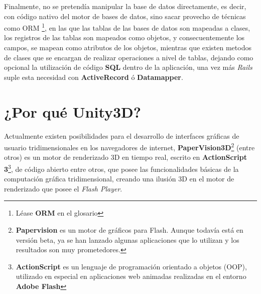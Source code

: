 Finalmente, no se pretendía manipular la base de datos directamente, es decir, con código nativo del motor de bases de datos, sino sacar provecho de técnicas como ORM \footnote{Léase \textbf{ORM} en el glosario}, en las que las tablas de las bases de datos son mapeadas a clases, los registros de las tablas son mapeados como objetos, y consecuentemente los campos, se mapean como atributos de los objetos, mientras que existen metodos de clases que se encargan de realizar operaciones a nivel de tablas, dejando como opcional la utilización de código \textbf{SQL} dentro de la aplicación, una vez más \emph{Rails} suple esta necesidad con \textbf{ActiveRecord} ó \textbf{Datamapper}.

\section{¿Por qué Unity3D?}
 
Actualmente existen posibilidades para el desarrollo de interfaces gráficas de usuario tridimensionales en los navegadores de internet, \textbf{PaperVision3D}\footnote{\textbf{Papervision} es un motor de gráficos para Flash. Aunque todavía está en versión beta, ya se han lanzado algunas aplicaciones que lo utilizan y los resultados son muy prometedores.} (entre otros) es un motor de renderizado 3D en tiempo real, escrito en \textbf{ActionScript 3}\footnote{\textbf{ActionScript} es un lenguaje de programación orientado a objetos (OOP), utilizado en especial en aplicaciones web animadas realizadas en el entorno \textbf{Adobe Flash}}, de código abierto entre otros, que posee las funcionalidades básicas de la computación gráfica tridimensional, creando una ilusión 3D en el motor de renderizado que posee el \emph{Flash Player}. \\

